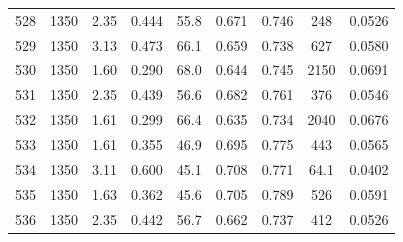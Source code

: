 \documentclass[11pt,twocolumn]{article}
\begin{document}
\begin{minipage}{\textwidth}
\begin{tabulary}{\linewidth}{C C C C C C C C C}
528    &       1350 &            2.35 &    0.444 &      55.8 &       0.671 &      0.746 &             248 &          0.0526 \\
529    &       1350 &            3.13 &    0.473 &      66.1 &       0.659 &      0.738 &             627 &          0.0580 \\
530    &       1350 &            1.60 &    0.290 &      68.0 &       0.644 &      0.745 &             2150 &        0.0691 \\
531    &       1350 &            2.35 &    0.439 &      56.6 &       0.682 &      0.761 &             376 &          0.0546 \\
532    &       1350 &            1.61 &    0.299 &      66.4 &       0.635 &      0.734 &             2040 &        0.0676 \\
533    &       1350 &            1.61 &    0.355 &      46.9 &       0.695 &      0.775 &             443 &          0.0565 \\
534    &       1350 &            3.11 &    0.600 &      45.1 &       0.708 &      0.771 &             64.1 &         0.0402 \\
535    &       1350 &            1.63 &    0.362 &      45.6 &       0.705 &      0.789 &             526 &          0.0591 \\
536    &       1350 &            2.35 &    0.442 &      56.7 &       0.662 &      0.737 &             412 &          0.0526 \\
\bottomrule
\end{tabulary}
\end{minipage}
\end{document}
